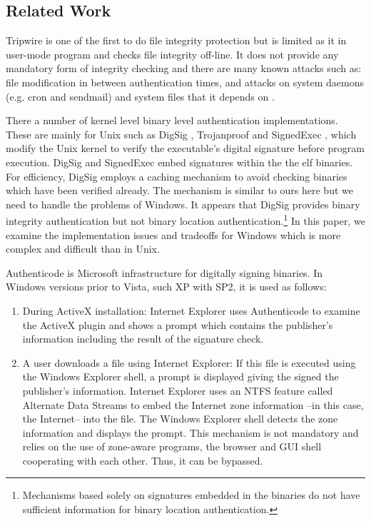 \subsection{Related Work}
\label{sect:related}

Tripwire \cite{KS93} is one of the first to do file integrity protection
but is limited as it in user-mode program and 
checks file integrity off-line.
It does not provide any mandatory form of integrity checking and
there are many known attacks such as:
file modification in between authentication times,
and attacks on system daemons (e.g. cron and sendmail)
and system files that it depends on \cite{Arnold,SKO05}.

There a number of kernel level binary level authentication implementations.
These are mainly for Unix
such as DigSig \cite{digsig}, Trojanproof \cite{williams}
and SignedExec \cite{signedexec}, which modify the Unix kernel
to verify the executable's digital signature before program execution.
DigSig and SignedExec embed signatures within the the elf binaries.
For efficiency, DigSig employs a caching mechanism to avoid checking
binaries which have been verified already. The mechanism is similar 
to ours here but we need to handle the problems of Windows.
It appears that DigSig provides binary integrity authentication
but not binary location authentication.\footnote{Mechanisms based solely on
signatures embedded in the binaries do not have sufficient information
for binary location authentication.}
In this paper, we examine the implementation issues and tradeoffs
for Windows which is more complex and difficult than in Unix.

Authenticode \cite{authenticode} is Microsoft infrastructure
for digitally signing binaries.
In Windows versions prior to Vista, such XP with SP2,
it is used as follows:
\begin{enumerate}
\item During ActiveX installation:
Internet Explorer uses Authenticode to examine the ActiveX plugin 
and shows a prompt which contains the publisher's information
including the result of the signature check.
\item A user downloads a file using Internet Explorer:
If this file is executed using the Windows Explorer shell,
a prompt is displayed giving the signed the publisher's information.
Internet Explorer uses an NTFS feature called
Alternate Data Streams to embed the Internet zone information --in this case,
the Internet-- into the file.
The Windows Explorer shell detects the zone information and displays the prompt.
This mechanism is not mandatory and relies on the use of zone-aware programs,
the browser and GUI shell cooperating with each other.
Thus, it can be bypassed.
\end{enumerate}

